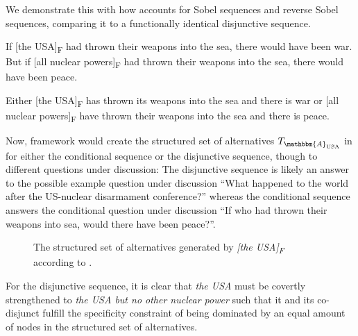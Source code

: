 We demonstrate this with how \textcite{Ippolito2020} accounts for Sobel sequences and reverse Sobel sequences, comparing it to a functionally identical disjunctive sequence.

\pex[nopreamble=true]%
\a{} If [the USA]\textsubscript{F} had thrown their weapons into the sea, there would have been war.
\a{} But if [all nuclear powers]\textsubscript{F} had thrown their weapons into the sea, there would have been peace.
\xe

\ex{}
Either [the USA]\textsubscript{F} has thrown its weapons into the sea and there is war or [all nuclear powers]\textsubscript{F} have thrown their weapons into the sea and there is peace.
\xe

Now,  framework would create the structured set of alternatives $T_{\mathbbm{A}_\text{USA}}$ in  for either the conditional sequence or the disjunctive sequence, though to different questions under discussion: The disjunctive sequence is likely an answer to the possible example question under discussion \enquote{What happened to the world after the US-nuclear disarmament conference?} whereas the conditional sequence answers the conditional question under discussion \enquote{If who had thrown their weapons into sea, would there have been peace?}.

\begin{figure}[!htb]
    \centering\hspace{-2cm}
    
    \caption{The structured set of alternatives generated by \textit{[the USA]\textsubscript{F}} according to \textcite{Ippolito2020}.}
\end{figure}

For the disjunctive sequence, it is clear that \textit{the USA} must be covertly strengthened to \textit{the USA but no other nuclear power} such that it and its co-disjunct fulfill the specificity constraint of being dominated by an equal amount of nodes in the structured set of alternatives.


